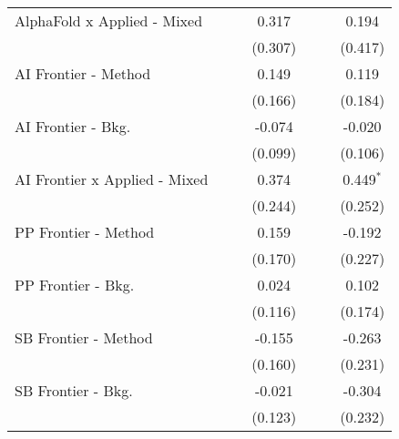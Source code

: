 \begin{tabular}{lcccccc}
   AlphaFold x Applied - Mixed   &               &               & 0.317         &               &               & 0.194\\   
                                 &               &               & (0.307)       &               &               & (0.417)\\   
   AI Frontier - Method          &               &               & 0.149         &               &               & 0.119\\   
                                 &               &               & (0.166)       &               &               & (0.184)\\   
   AI Frontier - Bkg.            &               &               & -0.074        &               &               & -0.020\\   
                                 &               &               & (0.099)       &               &               & (0.106)\\   
   AI Frontier x Applied - Mixed &               &               & 0.374         &               &               & 0.449$^{*}$\\   
                                 &               &               & (0.244)       &               &               & (0.252)\\   
   PP Frontier - Method          &               &               & 0.159         &               &               & -0.192\\   
                                 &               &               & (0.170)       &               &               & (0.227)\\   
   PP Frontier - Bkg.            &               &               & 0.024         &               &               & 0.102\\   
                                 &               &               & (0.116)       &               &               & (0.174)\\   
   SB Frontier - Method          &               &               & -0.155        &               &               & -0.263\\   
                                 &               &               & (0.160)       &               &               & (0.231)\\   
   SB Frontier - Bkg.            &               &               & -0.021        &               &               & -0.304\\   
                                 &               &               & (0.123)       &               &               & (0.232)\\   

\end{tabular}
